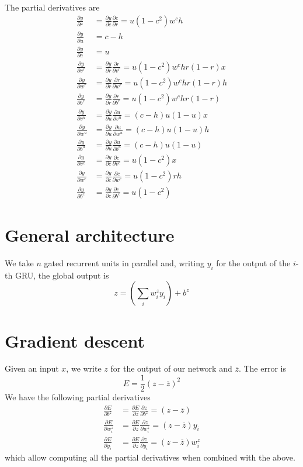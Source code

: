 \documentclass[a4paper]{article}
\newcommand{\pa}[1]{\left(#1\right)}
\newcommand{\ol}{\overline}
\begin{document}
The partial derivatives are
\begin{align*}
  \frac{\partial y}{\partial r}&=\frac{\partial y}{\partial c}\frac{\partial c}{\partial r}=u(1-c^2)w^ch\\
  \frac{\partial y}{\partial u}&=c-h\\
  \frac{\partial y}{\partial c}&=u\\
  \frac{\partial y}{\partial v^r}&=\frac{\partial y}{\partial r}\frac{\partial r}{\partial v^r}=u(1-c^2)w^chr(1-r)x\\
  \frac{\partial y}{\partial w^r}&=\frac{\partial y}{\partial r}\frac{\partial r}{\partial w^r}=u(1-c^2)w^chr(1-r)h\\
  \frac{\partial y}{\partial b^r}&=\frac{\partial y}{\partial r}\frac{\partial r}{\partial b^r}=u(1-c^2)w^chr(1-r)\\
  \frac{\partial y}{\partial v^u}&=\frac{\partial y}{\partial u}\frac{\partial u}{\partial v^u}=(c-h)u(1-u)x\\
  \frac{\partial y}{\partial w^u}&=\frac{\partial y}{\partial u}\frac{\partial u}{\partial w^u}=(c-h)u(1-u)h\\
  \frac{\partial y}{\partial b^u}&=\frac{\partial y}{\partial u}\frac{\partial u}{\partial b^u}=(c-h)u(1-u)\\
  \frac{\partial y}{\partial v^c}&=\frac{\partial y}{\partial c}\frac{\partial c}{\partial v^c}=u(1-c^2)x\\
  \frac{\partial y}{\partial w^c}&=\frac{\partial y}{\partial c}\frac{\partial c}{\partial w^c}=u(1-c^2)rh\\
  \frac{\partial y}{\partial b^c}&=\frac{\partial y}{\partial c}\frac{\partial c}{\partial b^c}=u(1-c^2)
\end{align*}

\section{General architecture}
We take $n$ gated recurrent units in parallel and, writing $y_i$ for the output
of the $i$-th GRU, the global output is
\[
  z=\pa{\sum_iw^z_iy_i}+b^z
\]

\section{Gradient descent}
Given an input $x$, we write $z$ for the output of our network and $\ol z$. The error is
\[
  E=\frac 12(z-\ol z)^2
\]
We have the following partial derivatives
\begin{align*}
  \frac{\partial E}{\partial b^z}&=\frac{\partial E}{\partial z}\frac{\partial z}{\partial b^z}=(z-\ol z)\\
  \frac{\partial E}{\partial w_i^z}&=\frac{\partial E}{\partial z}\frac{\partial z}{\partial w_i^z}=(z-\ol z)y_i\\
  \frac{\partial E}{\partial y_i}&=\frac{\partial E}{\partial z}\frac{\partial z}{\partial y_i}=(z-\ol z)w_i^z
\end{align*}
which allow computing all the partial derivatives when combined with the above.



\end{document}
